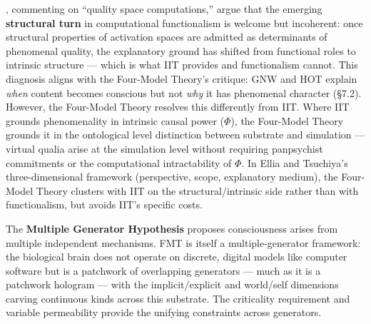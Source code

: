 \documentclass[12pt]{article}
\begin{document}
\citet{Ellia2025}, commenting on \citet{Fleming2024} ``quality space computations,'' argue that the emerging \textbf{structural turn} in computational functionalism is welcome but incoherent: once structural properties of activation spaces are admitted as determinants of phenomenal quality, the explanatory ground has shifted from functional roles to intrinsic structure --- which is what IIT provides and functionalism cannot. This diagnosis aligns with the Four-Model Theory's critique: GNW and HOT explain \emph{when} content becomes conscious but not \emph{why} it has phenomenal character (\S7.2). However, the Four-Model Theory resolves this differently from IIT. Where IIT grounds phenomenality in intrinsic causal power ($\Phi$), the Four-Model Theory grounds it in the ontological level distinction between substrate and simulation --- virtual qualia arise at the simulation level without requiring panpsychist commitments or the computational intractability of $\Phi$. In Ellia and Tsuchiya's three-dimensional framework (perspective, scope, explanatory medium), the Four-Model Theory clusters with IIT on the structural/intrinsic side rather than with functionalism, but avoids IIT's specific costs.

The \textbf{Multiple Generator Hypothesis} \citep{KirkebyHinrup2025} proposes consciousness arises from multiple independent mechanisms. FMT is itself a multiple-generator framework: the biological brain does not operate on discrete, digital models like computer software but is a patchwork of overlapping generators --- much as it is a patchwork hologram --- with the implicit/explicit and world/self dimensions carving continuous kinds across this substrate. The criticality requirement and variable permeability provide the unifying constraints across generators.
\end{document}
